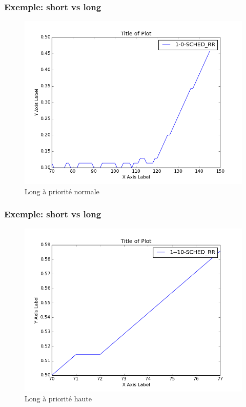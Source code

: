 \documentclass{beamer}
\begin{document}
\begin{frame}
    \frametitle{Exemple: short vs long}

    \begin{center}
        \begin{figure}
            \includegraphics[scale=0.3]{../../short_vs_long/figures/1-0-SCHED_RR.png}
            \caption{Long à priorité normale}
        \end{figure}
    \end{center}
\end{frame}

\begin{frame}
    \frametitle{Exemple: short vs long}

    \begin{center}
        \begin{figure}
            \includegraphics[scale=0.3]{../../short_vs_long/figures/1--10-SCHED_RR}
            \caption{Long à priorité haute}
        \end{figure}
    \end{center}
\end{frame}
\end{document}
